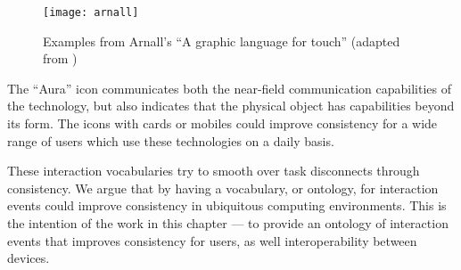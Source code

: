 \begin{figure}[bth]
	\begin{center}
        \texttt{[image: arnall]}
	\end{center}
        \caption{Examples from Arnall's ``A graphic language for touch'' (adapted from \cite{Arnall2006})}
        \label{arnall}
\end{figure}

The ``Aura'' icon communicates both the near-field communication capabilities of the technology, but also indicates that the physical object has capabilities beyond its form. The icons with cards or mobiles could improve consistency for a wide range of users which use these technologies on a daily basis.

These interaction vocabularies try to smooth over task disconnects through consistency. We argue that by having a vocabulary, or ontology, for interaction events could improve consistency in ubiquitous computing environments. This is the intention of the work in this chapter --- to provide an ontology of interaction events that improves consistency for users, as well interoperability between devices.











% 
% 
